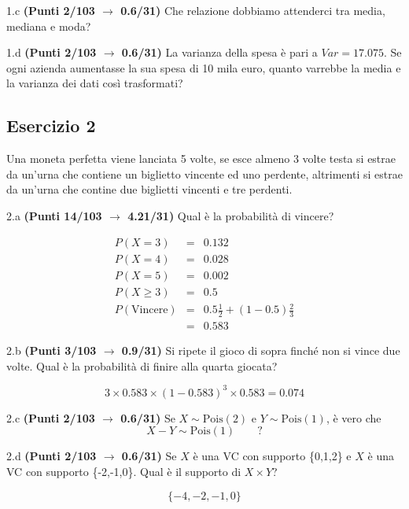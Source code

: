 \documentclass[
  11pt,
]{book}
\theoremstyle{mytheoremstyle}
\theoremstyle{mydefstyle}
\newenvironment{sol}
  {
  \begin{tcolorbox}[enhanced,breakable,arc=0.1mm,boxrule=1pt,colback=white,colframe=iblue,
  title=\bf \fontfamily{lmss}\selectfont \hspace{.5 cm} Soluzione,drop fuzzy shadow]

}{
\end{tcolorbox}
  }
\begin{document}
1.c \textbf{(Punti 2/103 \(\rightarrow\) 0.6/31)} Che relazione dobbiamo attenderci tra media, mediana e moda?

1.d \textbf{(Punti 2/103 \(\rightarrow\) 0.6/31)} La varianza della spesa è pari a \(Var=17.075\).
Se ogni azienda aumentasse la sua spesa di 10 mila euro, quanto varrebbe la media e la varianza dei dati così trasformati?

\subsection{Esercizio 2}\label{esercizio-2-16}

Una moneta perfetta viene lanciata 5 volte, se esce almeno 3 volte testa si estrae da un'urna che contiene
un biglietto vincente ed uno perdente, altrimenti si estrae da un'urna che contine due biglietti vincenti e tre perdenti.

2.a \textbf{(Punti 14/103 \(\rightarrow\) 4.21/31)} Qual è la probabilità di vincere?

\begin{sol}
\begin{eqnarray*}
  P(X=3) &=& 0.132\\
  P(X=4) &=& 0.028\\
  P(X=5) &=& 0.002\\
  P(X\ge 3)  &=& 0.5\\
  P(\text{Vincere})&=& 0.5\frac12+(1-0.5)\frac23\\
  &=& 0.583
\end{eqnarray*}

\end{sol}

2.b \textbf{(Punti 3/103 \(\rightarrow\) 0.9/31)} Si ripete il gioco di sopra finché non si vince due volte. Qual è la probabilità di finire alla quarta giocata?

\begin{sol}
\[
3\times 0.583\times (1-0.583)^3\times 0.583 = 0.074
\]

\end{sol}

2.c \textbf{(Punti 2/103 \(\rightarrow\) 0.6/31)} Se \(X\sim \text{Pois}(2)\) e \(Y\sim\text{Pois}(1)\), è vero che
\[
X-Y\sim\text{Pois}(1)\qquad ?
\]

2.d \textbf{(Punti 2/103 \(\rightarrow\) 0.6/31)} Se \(X\) è una VC con supporto \{0,1,2\} e \(X\) è una VC con supporto \{-2,-1,0\}.
Qual è il supporto di \(X\times Y\)?

\[
\{-4,-2,-1,0\}
\]
\end{document}
